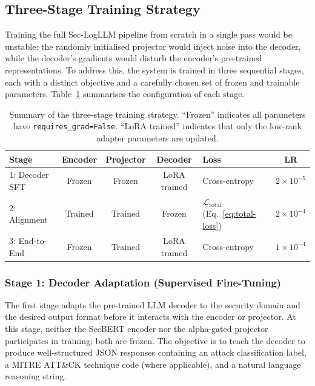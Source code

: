 \subsection{Three-Stage Training Strategy}\label{sec:training-strategy}

Training the full Sec-LogLLM pipeline from scratch in a single pass would be unstable: the randomly initialised projector would inject noise into the decoder, while the decoder's gradients would disturb the encoder's pre-trained representations. To address this, the system is trained in three sequential stages, each with a distinct objective and a carefully chosen set of frozen and trainable parameters. Table~\ref{tab:training-stages} summarises the configuration of each stage.

\begin{table}[H]
\centering
\small
\begin{tabular}{|l|c|c|c|l|c|}
\hline
\textbf{Stage} & \textbf{Encoder} & \textbf{Projector} & \textbf{Decoder} & \textbf{Loss} & \textbf{LR} \\
\hline
1: Decoder SFT & Frozen & Frozen & LoRA trained & Cross-entropy & $2 \times 10^{-5}$ \\
2: Alignment & Trained & Trained & Frozen & $\mathcal{L}_{\text{total}}$ (Eq.~\ref{eq:total-loss}) & $2 \times 10^{-4}$ \\
3: End-to-End & Frozen & Trained & LoRA trained & Cross-entropy & $1 \times 10^{-4}$ \\
\hline
\end{tabular}
\caption{Summary of the three-stage training strategy. ``Frozen'' indicates all parameters have \texttt{requires\_grad=False}. ``LoRA trained'' indicates that only the low-rank adapter parameters are updated.}
\label{tab:training-stages}
\end{table}

\subsubsection{Stage 1: Decoder Adaptation (Supervised Fine-Tuning)}

The first stage adapts the pre-trained LLM decoder to the security domain and the desired output format before it interacts with the encoder or projector. At this stage, neither the SecBERT encoder nor the alpha-gated projector participates in training; both are frozen. The objective is to teach the decoder to produce well-structured JSON responses containing an attack classification label, a MITRE ATT\&CK technique code (where applicable), and a natural language reasoning string.

